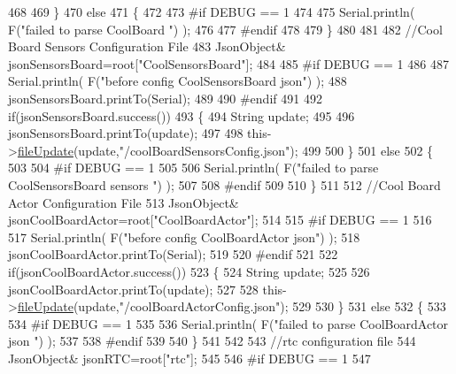 \begin{DoxyCode}
468         
469     \}
470     \textcolor{keywordflow}{else}
471     \{
472     
473 \textcolor{preprocessor}{    #if DEBUG == 1 }
474 
475         Serial.println( F(\textcolor{stringliteral}{"failed to parse CoolBoard "}) );
476     
477 \textcolor{preprocessor}{    #endif}
478 
479     \}       
480 
481     
482     \textcolor{comment}{//Cool Board Sensors Configuration File}
483         JsonObject& jsonSensorsBoard=root[\textcolor{stringliteral}{"CoolSensorsBoard"}];
484 
485 \textcolor{preprocessor}{#if DEBUG == 1 }
486 
487     Serial.println( F(\textcolor{stringliteral}{"before config CoolSensorsBoard json"}) );
488     jsonSensorsBoard.printTo(Serial);
489 
490 \textcolor{preprocessor}{#endif }
491     
492     \textcolor{keywordflow}{if}(jsonSensorsBoard.success())
493     \{   
494         String update;
495     
496         jsonSensorsBoard.printTo(update);
497 
498         this->\hyperlink{class_cool_file_system_a13f2958f5b87757c31fc53797a30d23a}{fileUpdate}(update,\textcolor{stringliteral}{"/coolBoardSensorsConfig.json"});      
499 
500     \}
501     \textcolor{keywordflow}{else}
502     \{
503 
504 \textcolor{preprocessor}{    #if DEBUG == 1}
505 
506         Serial.println( F(\textcolor{stringliteral}{"failed to parse CoolSensorsBoard sensors "}) );   
507     
508 \textcolor{preprocessor}{    #endif}
509 
510     \}
511 
512     \textcolor{comment}{//Cool Board Actor Configuration File}
513         JsonObject& jsonCoolBoardActor=root[\textcolor{stringliteral}{"CoolBoardActor"}];
514 
515 \textcolor{preprocessor}{#if DEBUG == 1 }
516 
517     Serial.println( F(\textcolor{stringliteral}{"before config CoolBoardActor json"}) );
518     jsonCoolBoardActor.printTo(Serial);
519 
520 \textcolor{preprocessor}{#endif }
521     
522     \textcolor{keywordflow}{if}(jsonCoolBoardActor.success())
523     \{   
524         String update;
525     
526         jsonCoolBoardActor.printTo(update);
527 
528         this->\hyperlink{class_cool_file_system_a13f2958f5b87757c31fc53797a30d23a}{fileUpdate}(update,\textcolor{stringliteral}{"/coolBoardActorConfig.json"});        
529 
530     \}
531     \textcolor{keywordflow}{else}
532     \{
533 
534 \textcolor{preprocessor}{    #if DEBUG == 1}
535 
536         Serial.println( F(\textcolor{stringliteral}{"failed to parse CoolBoardActor json "}) );    
537     
538 \textcolor{preprocessor}{    #endif}
539 
540     \}
541 
542     
543     \textcolor{comment}{//rtc configuration file}
544         JsonObject& jsonRTC=root[\textcolor{stringliteral}{"rtc"}];
545 
546 \textcolor{preprocessor}{#if DEBUG == 1 }
547     

\end{DoxyCode}
